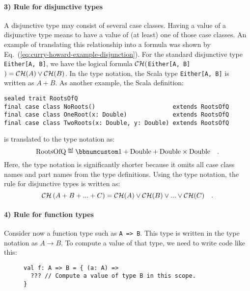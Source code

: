 \paragraph{3) Rule for disjunctive types}

A disjunctive type may consist of several case classes. Having a value
of a disjunctive type means to have a value of (at least) one of those
case classes. An example of translating this relationship into a formula
was shown by Eq.~(\ref{eq:curry-howard-example-disjunction}). For
the standard disjunctive type \lstinline!Either[A, B]!, we have the
logical formula ${\cal CH}($\lstinline!Either[A, B]!$)={\cal CH}(A)\vee{\cal CH}(B)$.
In the type notation, the Scala type \lstinline!Either[A, B]! is
written as $A+B$. As another example, the Scala definition:
\begin{lstlisting}
sealed trait RootsOfQ
final case class NoRoots()                      extends RootsOfQ
final case class OneRoot(x: Double)             extends RootsOfQ
final case class TwoRoots(x: Double, y: Double) extends RootsOfQ
\end{lstlisting}
is translated to the type notation as:
\[
\text{RootsOfQ}\triangleq\bbnum 1+\text{Double}+\text{Double}\times\text{Double}\quad.
\]
Here, the type notation is significantly shorter because it omits
all case class names and part names from the type definitions. Using
the type notation, the rule for disjunctive types is written as:
\[
{\cal CH}\left(A+B+...+C\right)={\cal CH}(A)\vee{\cal CH}(B)\vee...\vee{\cal CH}(C)\quad.
\]


\paragraph{4) Rule for function types}

Consider now a function type such as \lstinline!A => B!. This type
is written in the type notation as $A\rightarrow B$. To compute a
value of that type, we need to write code like this:

\begin{wrapfigure}{l}{0.5\columnwidth}%
\vspace{-0.65\baselineskip}
\begin{lstlisting}
val f: A => B = { (a: A) =>
  ??? // Compute a value of type B in this scope.
}
\end{lstlisting}

\vspace{-0.9\baselineskip}
\end{wrapfigure}%

